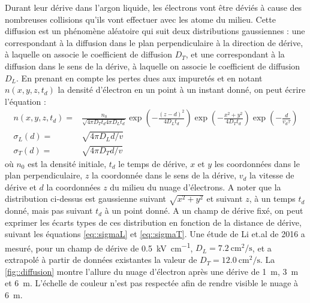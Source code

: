         Durant leur dérive dans l'argon liquide, les électrons vont être déviés à cause des nombreuses collisions qu'ils vont effectuer avec les atome du milieu. Cette diffusion est un phénomène aléatoire qui suit deux distributions gaussiennes : une correspondant à la diffusion dans le plan perpendiculaire à la direction de dérive, à laquelle on associe le coefficient de diffusion $D_T$, et une correspondant à la diffusion dans le sens de la dérive, à laquelle on associe le coefficient de diffusion $D_L$. En prenant en compte les pertes dues aux impuretés et en notant $n(x,y,z,t_d)$ la densité d'électron en un point à un instant donné, on peut écrire l'équation : 
        \begin{eqnarray}
          n(x,y,z,t_d) = & \frac{n_0}{\sqrt{4\pi D_T t_d4\pi D_L t_d}}\exp\left(-\frac{(z-d)^2}{4D_L t_d}\right)\exp\left(-\frac{x^2+y^2}{4D_T t_d}\right)\exp\left(-\frac{d}{v_d\tau}\right) \label{eq::diffusion} \\
          \sigma_L(d) = & \sqrt{4\pi D_Ld/v} \label{eq::sigmaL}\\
          \sigma_T(d) = & \sqrt{4\pi D_Td/v} \label{eq::sigmaT}
        \end{eqnarray}
        où $n_0$ est la densité initiale, $t_d$ le temps de dérive, $x$ et $y$ les coordonnées dans le plan perpendiculaire, $z$ la coordonnée dans le sens de la dérive, $v_d$ la vitesse de dérive et $d$ la coordonnées $z$ du milieu du nuage d'électrons. A noter que la distribution ci-dessus est gaussienne suivant $\sqrt{x^2+y^2}$ et suivant $z$, à un temps $t_d$ donné, mais pas suivant $t_d$ à un point donné. A un champ de dérive fixé, on peut exprimer les écarts types de ces distribution en fonction de la distance de dérive, suivant les équations \eqref{eq::sigmaL} et \eqref{eq::sigmaT}. Une étude de Li et.al de 2016\cite{Li2015} a mesuré, pour un champ de dérive de \SI{0.5}{\kilo\volt\per\centi\meter}, $D_L=\SI{7.2}{\centi\meter\squared\per\second}$, et a extrapolé à partir de données existantes la valeur de $D_T=\SI{12.0}{\centi\meter\squared\per\second}$. La \autoref{fig::diffusion} montre l'allure du nuage d'électron après une dérive de \SI{1}{\meter}, \SI{3}{\meter} et \SI{6}{\meter}. L'échelle de couleur n'est pas respectée afin de rendre visible le nuage à \SI{6}{\meter}.

